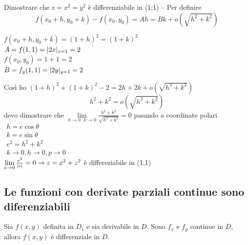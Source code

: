 \begin{esercizio}
  Dimostrare che $z=x^2=y^2$ è differenziabile in (1;1) -- Per definire
  \begin{equation*}
    f(x_0+h,y_0+k)-f(x_0,y_0)=Ah=Bk+o(\sqrt{h^2+k^2})
  \end{equation*}
  \begin{multicols}{2}
    $f(x_0+h,y_0+k)=(1+h)^2=(1+k)^2$\\
    $A=f(1,1)=\lvert2x\rvert_{x=1}=2$\\
    $f(x_0,y_0)=1+1=2$\\
    $B=f_y(1,1)=\lvert2y\rvert_{y=1}=2$
  \end{multicols}
  Così ho $(1+h)^2+(1+k)^2-2=2h+2k+o(\sqrt{h^2+k^2})$
  \begin{equation*}
    h^2+k^2=o(\sqrt{h^2+k^2})
  \end{equation*}
  devo dimostrare che $\lim\limits_{h\to 0\text{ } k\to0}\frac{h^2+k^2}{\sqrt{h^2+k^2}}=0$ pasando
  a coordinate polari $\begin{matrix} h=e\cos \theta\\ k=e\sin \theta\\ e^2=h^2+k^2\\ k\to 0,h\to 0,
                         p\to 0\end{matrix}$\\ 
                       $\lim\limits_{e\to 0}\frac{e^2}{\lvert e\rvert}=0 \to z=x^2+z^2$ è differeziabile in (1,1)
\end{esercizio}
\subsection{Le funzioni con derivate parziali continue sono diferenziabili}
\begin{defi}
  Sia $f(x,y)$ definita in $D_1$ e sia derivabile in $D$. Sono $f_x$ e $f_y$ continue in $D$, allora
  $f(x,y)$ è differenziale in $D$.
\end{defi}
